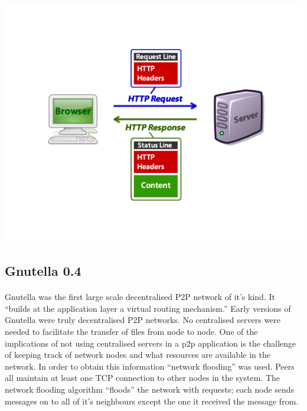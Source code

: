 \documentclass[11pt]{amsart}
\begin{document}
\paragraph{}
\includegraphics[scale=.7]{http_diagram}\cite{http://probablycopyrighted.com/wp-content/uploads/http_diagram.png}

\subsection{Gnutella 0.4}\cite{GnutellaCase}
\paragraph{}
Gnutella was the first large scale decentralised P2P network of it's kind. It ``builds at the application layer a virtual routing mechanism.''\cite{GnutellaCase} Early versions of Gnutella were truly decentralised P2P networks. No centralised servers were needed to facilitate the transfer of files from node to node.
One of the implications of not using centralised servers in a p2p application is the challenge of keeping track of network nodes and what resources are available in the network. In order to obtain this information ``network flooding'' was used. Peers all maintain at least one TCP connection to other nodes in the system. The network flooding algorithm ``floods'' the network with requests; each node sends messages on to all of it's neighbours except the one it received the message from. 
\end{document}
